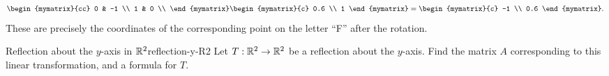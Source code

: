 \begin{solution}
\begin{equation*}
\begin{mymatrix}{cc}
      0 & -1 \\
      1 & 0 \\
    \end{mymatrix}
    \begin{mymatrix}{c} 0.6 \\ 1 \end{mymatrix}
    = \begin{mymatrix}{c} -1 \\ 0.6 \end{mymatrix}.
  \end{equation*}
  These are precisely the coordinates of the corresponding point on
  the letter ``F'' after the rotation.
\end{solution}

\begin{example}{Reflection about the $y$-axis in $\mathbb{R}^2$}{reflection-y-R2}
  Let $T:\mathbb{R}^2\to\mathbb{R}^2$ be a reflection about the $y$-axis. Find the
  matrix%
   $A$ corresponding to this
  linear transformation, and a formula for $T$.
\end{example}

